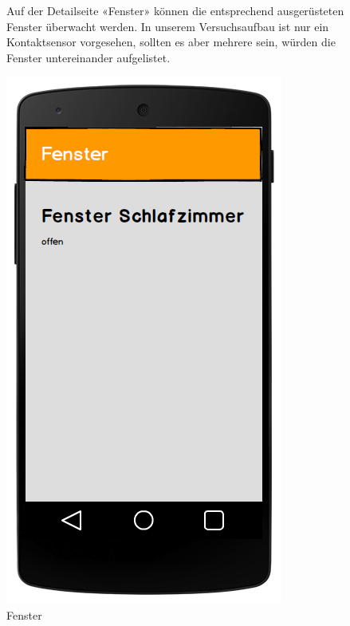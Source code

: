 \begin{figure}[htbp]
	\begin{minipage}{0.6\textwidth} 
Auf der Detailseite «Fenster» können die entsprechend ausgerüsteten Fenster überwacht werden. In unserem Versuchsaufbau ist nur ein Kontaktsensor vorgesehen, sollten es aber mehrere sein, würden die Fenster untereinander aufgelistet.
	\end{minipage}
	\hfill
	\begin{minipage}{0.32\textwidth}
		\includegraphics[width=\textwidth]{report/img/mockup_window.png}
		\caption{Fenster}
		\label{fig:mockupWindow}
	\end{minipage}
\end{figure}

